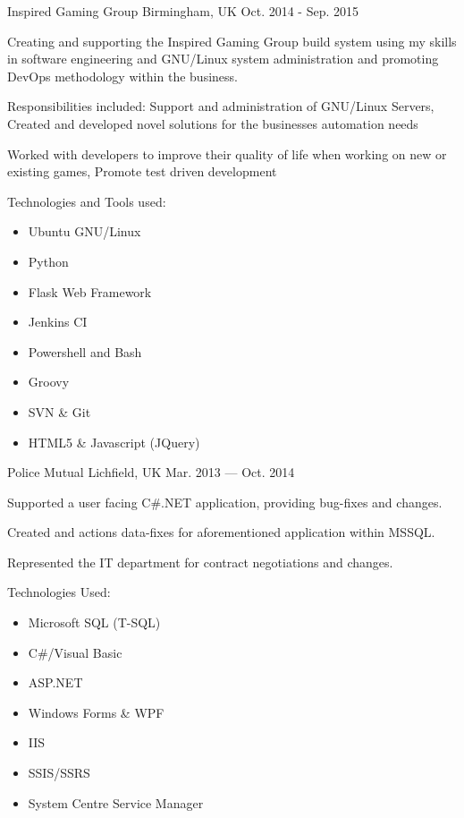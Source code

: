 \begin{cventries}
    
    {Inspired Gaming Group} %
    {Birmingham, UK} %
    {Oct. 2014 - Sep. 2015} %
    {
	    \begin{cvitems} %
	    \item {Creating and supporting the Inspired Gaming Group build system using my skills in software engineering and GNU/Linux system administration and promoting DevOps methodology within the business.}
	    \item {Responsibilities included: Support and administration of GNU/Linux Servers, Created and developed novel solutions for the businesses automation needs}
	    \item{Worked with developers to improve their quality of life when working on new or existing games, Promote test driven development}
	    \item{Technologies and Tools used:}
		    \begin{itemize}
			    \item{Ubuntu GNU/Linux}
			    \item{Python}
			    \item{Flask Web Framework}
			    \item{Jenkins CI}
			    \item{Powershell and Bash}
			    \item{Groovy}
			    \item{SVN \& Git}
			    \item{HTML5 \& Javascript (JQuery)}
		    \end{itemize}
	    \end{cvitems}
    }

    
    {Police Mutual} %
    {Lichfield, UK} %
    {Mar. 2013 — Oct. 2014} %
    {
	    \begin{cvitems} %
	    \item {Supported a user facing C\#.NET application, providing bug-fixes and changes.}
	    \item {Created and actions data-fixes for aforementioned application within MSSQL.}
	    \item {Represented the IT department for contract negotiations and changes.}
	    \item {Technologies Used:}
		    \begin{itemize}
			    \item{Microsoft SQL (T-SQL)}
			    \item{C\#/Visual Basic}
			    \item{ASP.NET}
			    \item{Windows Forms \& WPF}
			    \item{IIS}
			    \item{SSIS/SSRS}
			    \item{System Centre Service Manager}
		    \end{itemize}
	    \end{cvitems}
    }


\end{cventries}
